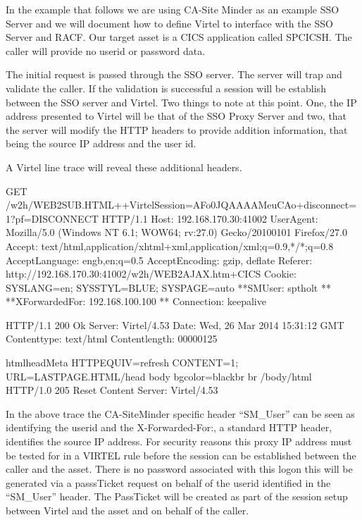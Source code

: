 \documentclass[letterpaper,10pt,english]{sphinxmanual}
\begin{document}
In the example that follows we are using CA-Site Minder as an example SSO Server and we will document how to define Virtel to interface with the SSO Server and RACF. Our target asset is a CICS application called SPCICSH. The caller will provide no userid or password data.

 

The initial request is passed through the SSO server. The server will trap and validate the caller. If the validation is successful a session will be establish between the SSO server and Virtel. Two things to note at this point. One, the IP address presented to Virtel will be that of the SSO Proxy Server and two, that the server will modify the HTTP headers to provide addition information, that being the source IP address and the user id.

A Virtel line trace will reveal these additional headers.

\begin{sphinxVerbatim}[commandchars=\\\{\}]
GET /w2h/WEB2SUB.HTML++VirtelSession=AFo0JQAAAAMeuCAo+disconnect=1?pf=DISCONNECT HTTP/1.1
Host: 192.168.170.30:41002
User\PYGZhy{}Agent: Mozilla/5.0 (Windows NT 6.1; WOW64; rv:27.0) Gecko/20100101 Firefox/27.0
Accept: text/html,application/xhtml+xml,application/xml;q=0.9,\PYGZbs{}*/\PYGZbs{}*;q=0.8
Accept\PYGZhy{}Language: en\PYGZhy{}gb,en;q=0.5
Accept\PYGZhy{}Encoding: gzip, deflate
Referer: http://192.168.170.30:41002/w2h/WEB2AJAX.htm+CICS
Cookie: SYSLANG=en; SYSSTYL=BLUE; SYSPAGE=auto
**SM\PYGZus{}User: sptholt \PYGZlt{}\PYGZlt{}**
**X\PYGZhy{}Forwarded\PYGZhy{}For: 192.168.100.100 \PYGZlt{}\PYGZlt{}**
Connection: keep\PYGZhy{}alive

HTTP/1.1 200 Ok
Server: Virtel/4.53
Date: Wed, 26 Mar 2014 15:31:12 GMT
Content\PYGZhy{}type: text/html
Content\PYGZhy{}length: 00000125

\PYGZlt{}html\PYGZgt{}\PYGZlt{}head\PYGZgt{}\PYGZlt{}Meta HTTP\PYGZhy{}EQUIV=\PYGZdq{}refresh\PYGZdq{} CONTENT=\PYGZdq{}1; URL=LASTPAGE.HTML\PYGZdq{}\PYGZgt{}\PYGZlt{}/head\PYGZgt{}
\PYGZlt{}body bgcolor=\PYGZdq{}black\PYGZdq{}\PYGZgt{}\PYGZlt{}br\PYGZgt{}
\PYGZlt{}br\PYGZgt{}
\PYGZlt{}/body\PYGZgt{}\PYGZlt{}/html\PYGZgt{}
HTTP/1.0 205 Reset Content
Server: Virtel/4.53
\end{sphinxVerbatim}

In the above trace the CA-SiteMinder specific header “SM\_User” can be seen as identifying the userid and the X-Forwarded-For:, a standard HTTP header, identifies the source IP address. For security reasons this proxy IP address must be tested for in a VIRTEL rule before the session can be established between the caller and the asset. There is no password associated with this logon \textendash{} this will be generated via a passsTicket request on behalf of the userid identified in the “SM\_User” header. The PassTicket will be created as part of the session setup between Virtel and the asset and on behalf of the caller.
\end{document}
